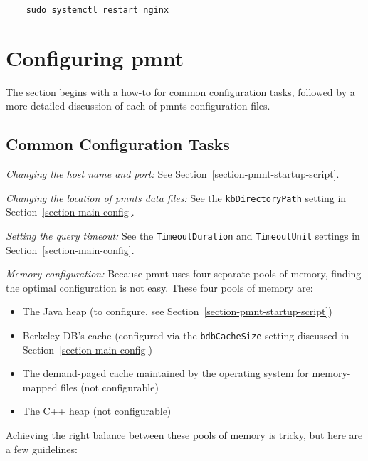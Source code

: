 \begin{Verbatim}
	sudo systemctl restart nginx
\end{Verbatim}



\section{Configuring \ac{pmnt}}
\label{section-configuring-pmnt}

The section begins with a how-to for common configuration tasks, followed by a more detailed discussion of each of \acp{pmnt} configuration files.

\subsection{Common Configuration Tasks}
\label{section-common-config-tasks}

\emph{Changing the host name and port:} See Section~\ref{section-pmnt-startup-script}.

\emph{Changing the location of \acp{pmnt} data files:} See the \texttt{kbDirectoryPath} setting in Section~\ref{section-main-config}.

\emph{Setting the query timeout:} See the \texttt{TimeoutDuration} and \texttt{TimeoutUnit} settings in Section~\ref{section-main-config}.

\emph{Memory configuration:} Because \ac{pmnt} uses four separate pools of memory, finding the optimal configuration is not easy.  These four pools of memory are:
\begin{itemize}[noitemsep]
	\item The Java heap (to configure, see Section~\ref{section-pmnt-startup-script})
	\item Berkeley DB's cache (configured via the \texttt{bdbCacheSize} setting discussed in Section~\ref{section-main-config})
	\item The demand-paged cache maintained by the operating system for memory-mapped files (not configurable)
	\item The C++ heap (not configurable)
\end{itemize}
Achieving the right balance between these pools of memory is tricky, but here are a few guidelines:

